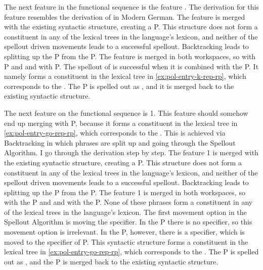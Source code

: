 The next feature in the functional sequence is the feature . The derivation for this feature resembles the derivation of  in Modern German.
The feature is merged with the existing syntactic structure, creating a P.
This structure does not form a constituent in any of the lexical trees in the language's lexicon, and neither of the spellout driven movements leads to a successful spellout.
Backtracking leads to splitting up the P from the P.
The feature  is merged in both workspaces, so with P and and with P. The spellout of  is successful when it is combined with the P.
It namely forms a constituent in the lexical tree in \ref{ex:pol-entry-k-rep-rp}, which corresponds to the .
The P is spelled out as , and it is merged back to the existing syntactic structure.

The next feature on the functional sequence is 1. This feature should somehow end up merging with P, because it forms a constituent in the lexical tree in \ref{ex:pol-entry-go-rep-rp}, which corresponds to the .
This is achieved via Backtracking in which phrases are split up and going through the Spellout Algorithm. I go through the derivation step by step.
The feature 1 is merged with the existing syntactic structure, creating a P.
This structure does not form a constituent in any of the lexical trees in the language's lexicon, and neither of the spellout driven movements leads to a successful spellout.
Backtracking leads to splitting up the P from the P.
The feature 1 is merged in both workspaces, so with the P and and with the P. None of these phrases form a constituent in any of the lexical trees in the language's lexicon.
The first movement option in the Spellout Algorithm is moving the specifier. In the P there is no specifier, so this movement option is irrelevant. In the P, however, there is a specifier, which is moved to the specifier of P.
This syntactic structure forms a constituent in the lexical tree in \ref{ex:pol-entry-go-rep-rp}, which corresponds to the .
The P is spelled out as , and the P is merged back to the existing syntactic structure.

